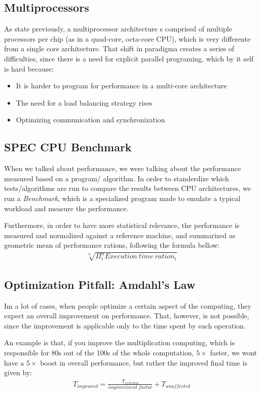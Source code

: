 \documentclass{article}
\begin{document}
\subsection{Multiprocessors}
As state previously, a multiprocessor architecture s comprised of multiple processors per chip (as in a quad-core, octa-core CPU), which is very differente from a single core architecture. That shift in paradigma creates a series of difficulties, since there is a need for explicit parallel programing, which by it self is hard because:
\begin{itemize}
    \item It is harder to program for performance in a multi-core architecture
    \item The need for a load balancing strategy rises
    \item Optimizing communication and synchronization
\end{itemize}

\subsection{SPEC CPU Benchmark}

When we talked about performance, we were talking about the performance measured based on a program/ algorithm. In order to standerdize which tests/algorithms are run to compare the results between CPU architectures, we run a \emph{Benchmark}, which is a specialized program made to emulate a typical workload and measure the performance.

Furthermore, in order to have more statistical relevance, the performance is measured and normalized against a reference machine, and summarized as geometric mean of performance rations, following the formula bellow:
\begin{align}
    \sqrt[n]{\Pi ^n _i Execution\ time\ ration_i}
\end{align}

\subsection{Optimization Pitfall: Amdahl's Law}
Im a lot of cases, when people optimize a certain aspect of the computing, they expect an overall improvement on performance. That, however, is not possible, since the improvement is applicable only to the time spent by such operation. 

An example is that, if you improve the multiplication computing, which is responsible for 80s out of the 100s of the whole computation, $5\times$ faster, we wont have a $5\times$ boost in overall performance, but rather the improved final time is given by:
\begin{align}
    T_{improved} = \frac{T_{affected}}{improvement \ factor} + T_{unaffected}
\end{align}
\end{document}

